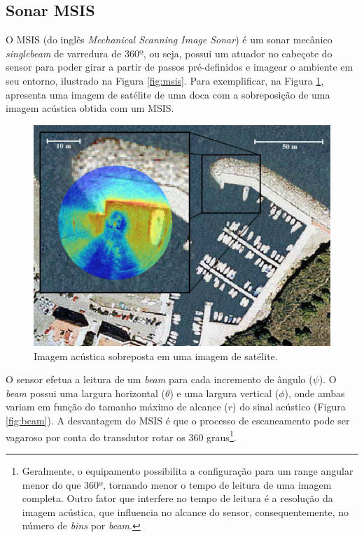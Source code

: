 \subsection{Sonar MSIS}
\label{sec:msis}
O MSIS (do inglês \textit{Mechanical Scanning Image Sonar}) é um sonar mecânico \textit{singlebeam} de varredura de 360º, ou seja, possui um atuador no cabeçote do sensor para poder girar a partir de passos pré-definidos e imagear o ambiente em seu entorno, ilustrado na Figura \ref{fig:msis}. 
Para exemplificar, na Figura \ref{fig:msis-image}, apresenta uma imagem de satélite de uma doca com a sobreposição de uma imagem acústica obtida com um MSIS.

\begin{figure}[H]
    \centering
    \includegraphics[scale=0.3]{dados/figuras/msis_image.png}
    \caption{Imagem acústica sobreposta em uma imagem de satélite.}
    \vspace{-0.8em}
    \label{fig:msis-image}
\end{figure}

O sensor efetua a leitura de um \textit{beam} para cada incremento de ângulo ($\psi$). 
O \textit{beam} possui uma largura horizontal ($\theta$) e uma largura vertical ($\phi$), onde ambas variam em função do tamanho máximo de alcance ($r$) do sinal acústico (Figura \ref{fig:beam}).
A desvantagem do MSIS é que o processo de escaneamento pode ser vagaroso por conta do transdutor rotar os 360 graus\footnote{Geralmente, o equipamento possibilita a configuração para um range angular menor do que 360º, tornando menor o tempo de leitura de uma imagem completa. Outro fator que interfere no tempo de leitura é a resolução da imagem acústica, que influencia no alcance do sensor, consequentemente, no número de \textit{bins} por \textit{beam}.}.

